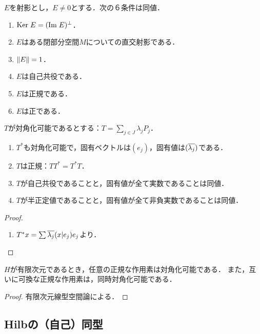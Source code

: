 \documentclass[uplatex,dvipdfmx]{jsreport}
\begin{document}
\begin{lemma}[直交射影の特徴付け]
    $E$を射影とし，$E\ne 0$とする．次の６条件は同値．
    \begin{enumerate}
        \item $\mathrm{Ker}\; E=(\mathrm{Im}\; E)^\perp$．
        \item $E$はある閉部分空間$M$についての直交射影である．
        \item $\|E\|=1$．
        \item $E$は自己共役である．
        \item $E$は正規である．
        \item $E$は正である．
    \end{enumerate}
\end{lemma}

\begin{lemma}[対角化可能作用素の性質]
    $T$が対角化可能であるとする：$T=\sum_{j\in J}\lambda_jP_j$．
    \begin{enumerate}
        \item $T^*$も対角化可能で，固有ベクトルは$(e_j)$，固有値は$(\overline{\lambda_j})$である．
        \item $T$は正規：$TT^*=T^*T$．
        \item $T$が自己共役であることと，固有値が全て実数であることは同値．
        \item $T$が半正定値であることと，固有値が全て非負実数であることは同値．
    \end{enumerate}
\end{lemma}
\begin{proof}\mbox{}
    \begin{enumerate}
        \item $T^*x=\sum\overline{\lambda_j}(x|e_j)e_j$より．
    \end{enumerate}
\end{proof}

\begin{proposition}[有限次元線型空間論]
    $H$が有限次元であるとき，任意の正規な作用素は対角化可能である．
    また，互いに可換な正規な作用素は，同時対角化可能である．
\end{proposition}
\begin{proof}
    有限次元線型空間論による．
\end{proof}

\subsection{Hilbの（自己）同型}
\end{document}
